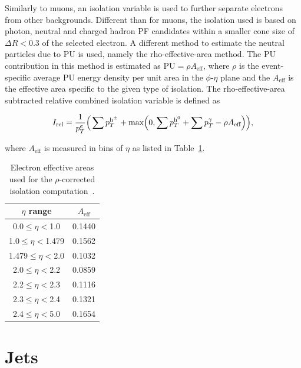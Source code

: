 Similarly to muons, an isolation variable is used to further separate electrons from other backgrounds.
Different than for muons, the isolation used is based on photon, neutral and charged hadron \ac{PF} candidates within a smaller cone size of $\Delta R<0.3$ of the selected electron.
A different method to estimate the neutral particles due to \ac{PU} is used, namely the rho-effective-area method. 
The \ac{PU} contribution in this method is estimated as $\text{PU}=\rho A_{\text{eff}}$, where $\rho$ is the event-specific average \ac{PU} energy density per unit area in the $\phi$-$\eta$ plane and the $A_{\text{eff}}$ is the effective area specific to the given type of isolation. 
The rho-effective-area subtracted relative combined isolation variable is defined as

\begin{equation}
\label{eqn:electron_reliso_rho}
I_{\text{rel}} = \frac{1}{p_{T}^{e}} \Big( \sum p_{T}^{\text{h}^{\pm}} + \text{max}\Big( 0, \sum p_{T}^{\text{h}^0} + \sum p_{T}^{\gamma} - \rho A_{\text{eff}} \Big) \Big),
\end{equation}

where $A_{\text{eff}}$ is measured in bins of $\eta$ as listed in Table~\ref{tab:EleEA}.

\begin{table}[htb]
\begin{center}
\begin{tabular}{|c|c|}
\hline
$\eta$ range & $A_{\text{eff}}$ \\
\hline
\hline
0.0$\leq\eta<$1.0   &  0.1440 \\
1.0$\leq\eta<$1.479 &  0.1562 \\
1.479$\leq\eta<$2.0 &  0.1032 \\
2.0$\leq\eta<$2.2   &  0.0859 \\
2.2$\leq\eta<$2.3   &  0.1116 \\
2.3$\leq\eta<$2.4   &  0.1321 \\
2.4$\leq\eta<$5.0   &  0.1654 \\
\hline
\end{tabular}
\end{center}
\caption{
 Electron effective areas used for the $\rho$-corrected isolation computation~\cite{CMS:2015xaf}.
}
\label{tab:EleEA}
\end{table}

\section{Jets}

